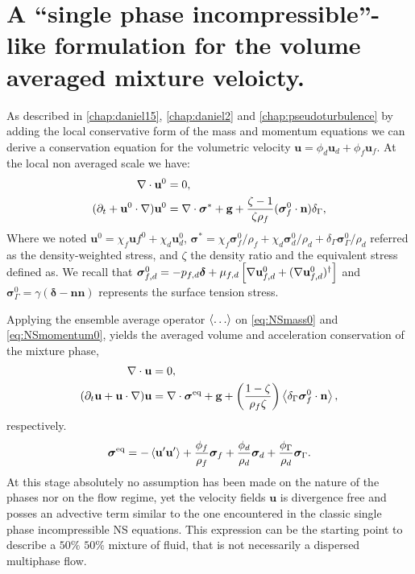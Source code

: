 \section{A ``single phase incompressible''-like formulation for the volume averaged mixture veloicty. }

As described in \ref{chap:daniel15}, \ref{chap:daniel2} and \ref{chap:pseudoturbulence} by adding the local conservative form of the mass and momentum equations we can derive a conservation equation for the volumetric velocity $\textbf{u} =\phi_d\textbf{u}_d + \phi_f \textbf{u}_f$. 
At the local non averaged scale we have: 
\begin{align}
    \label{eq:NSmass0}
    \div \textbf{u}^0 &= 0, \\
    (\pddt 
    + \textbf{u}^0 \cdot \grad) \textbf{u}^0
    &= 
    \div \bm\sigma^*
    +\textbf{g}
    +\frac{\zeta-1}{\zeta\rho_f}(\bm\sigma_f^0\cdot \textbf{n})\delta_\Gamma,
    \label{eq:NSmomentum0}
\end{align}
Where we noted $\textbf{u}^0 = \chi_f \textbf{u}f^0 + \chi_d \textbf{u}_d^0$, $\bm\sigma^* = \chi_f \bm\sigma_f^0/\rho_f  + \chi_d \bm\sigma_d^0/\rho_d + \delta_\Gamma \bm\sigma_\Gamma^0/\rho_d $ referred as the density-weighted stress, and $\zeta$ the density ratio and the equivalent stress defined as.
We recall that $\bm\sigma_{f,d}^0 = -p_{f,d}\bm\delta + \mu_{f,d}\left[\mathbf{\nabla} \textbf{u}_{f,d}^0+ (\mathbf{\nabla} \textbf{u}_{f,d}^0)^\dagger\right]$ and $\bm\sigma_\Gamma^0 = \gamma (\bm\delta - \textbf{nn})$ represents the surface tension stress.

Applying the ensemble average operator $\left<\ldots\right>$ on \ref{eq:NSmass0} and \ref{eq:NSmomentum0}, yields the averaged volume and acceleration conservation of the mixture phase, 
\begin{align}
    \div\textbf{u} &=0,\\
    (\pddt \textbf{u}  
    + \textbf{u} \cdot \grad )
    \textbf{u}
    &= 
    \div \bm{\sigma}^\text{eq} + 
    \textbf{g} 
    + \left(\frac{1-\zeta}{\rho_f\zeta}\right) \avg{\delta_\Gamma \bm{\sigma}_f^0 \cdot \textbf{n}},
    \label{eq:NS_firststep}
\end{align}
respectively. 
\begin{equation}
    \bm\sigma^\text{eq} = 
    - \left< \textbf{u}'\textbf{u}'\right>
    + \frac{\phi_f}{\rho_f}\bm\sigma_f
    + \frac{\phi_d}{\rho_d}\bm\sigma_d
    + \frac{\phi_\Gamma}{\rho_d} \bm\sigma_\Gamma. 
\end{equation}
At this stage absolutely no assumption has been made on the nature of the phases nor on the flow regime, yet the velocity fields $\textbf{u}$ is divergence free and posses an advective term similar to the one encountered in the classic single phase incompressible NS equations.
This expression can be the starting point to describe a $50\%$ $50\%$ mixture of fluid, that is not necessarily a dispersed multiphase flow. 

